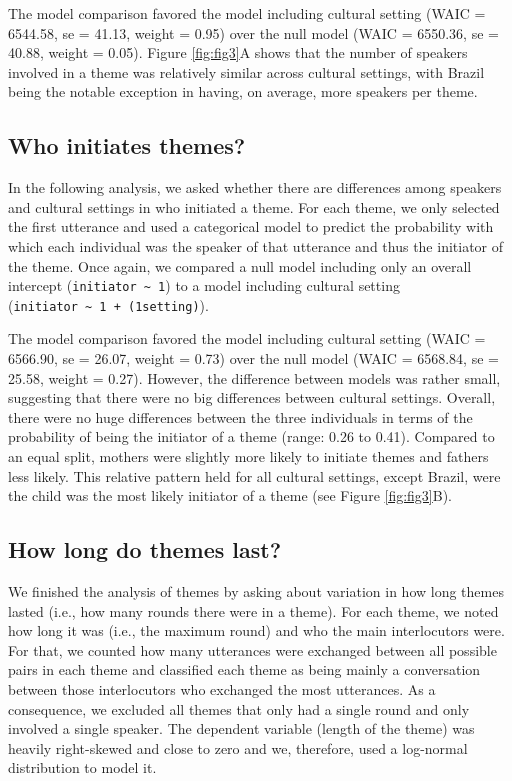 \documentclass[
  man,floatsintext]{apa6}
\begin{document}
The model comparison favored the model including cultural setting (WAIC = 6544.58, se = 41.13, weight = 0.95) over the null model (WAIC = 6550.36, se = 40.88, weight = 0.05). Figure \ref{fig:fig3}A shows that the number of speakers involved in a theme was relatively similar across cultural settings, with Brazil being the notable exception in having, on average, more speakers per theme.

\hypertarget{who-initiates-themes}{%
\subsection{Who initiates themes?}\label{who-initiates-themes}}

In the following analysis, we asked whether there are differences among speakers and cultural settings in who initiated a theme. For each theme, we only selected the first utterance and used a categorical model to predict the probability with which each individual was the speaker of that utterance and thus the initiator of the theme. Once again, we compared a null model including only an overall intercept (\texttt{initiator\ \textasciitilde{}\ 1}) to a model including cultural setting (\texttt{initiator\ \textasciitilde{}\ 1\ +\ (1\textbar{}setting)}).

The model comparison favored the model including cultural setting (WAIC = 6566.90, se = 26.07, weight = 0.73) over the null model (WAIC = 6568.84, se = 25.58, weight = 0.27). However, the difference between models was rather small, suggesting that there were no big differences between cultural settings. Overall, there were no huge differences between the three individuals in terms of the probability of being the initiator of a theme (range: 0.26 to 0.41). Compared to an equal split, mothers were slightly more likely to initiate themes and fathers less likely. This relative pattern held for all cultural settings, except Brazil, were the child was the most likely initiator of a theme (see Figure \ref{fig:fig3}B).

\hypertarget{how-long-do-themes-last}{%
\subsection{How long do themes last?}\label{how-long-do-themes-last}}

We finished the analysis of themes by asking about variation in how long themes lasted (i.e., how many rounds there were in a theme). For each theme, we noted how long it was (i.e., the maximum round) and who the main interlocutors were. For that, we counted how many utterances were exchanged between all possible pairs in each theme and classified each theme as being mainly a conversation between those interlocutors who exchanged the most utterances. As a consequence, we excluded all themes that only had a single round and only involved a single speaker. The dependent variable (length of the theme) was heavily right-skewed and close to zero and we, therefore, used a log-normal distribution to model it.
\end{document}
